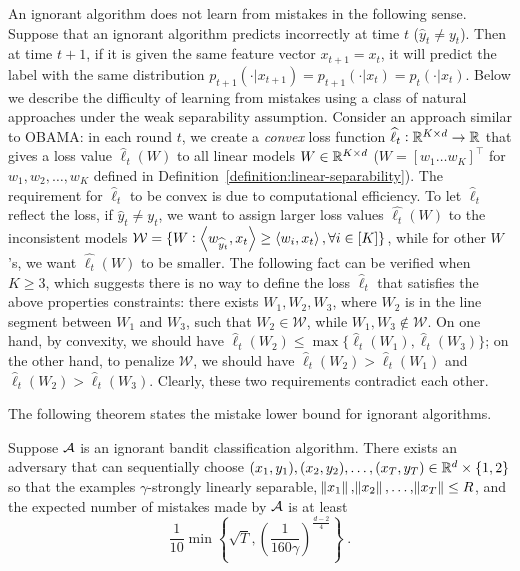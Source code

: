 An ignorant algorithm does not learn from mistakes in the following sense.
Suppose that an ignorant algorithm predicts incorrectly at time $t$ ($\widehat
y_t \neq y_t$). Then at time $t+1$, if it is given the same feature vector
$x_{t+1}=x_t$, it will predict the label with the same distribution
$p_{t+1}(\cdot|x_{t+1})=p_{t+1}(\cdot|x_t)=p_t(\cdot|x_t)$. Below we describe
the difficulty of learning from mistakes using a class of natural approaches
under the weak separability assumption. Consider an approach similar to OBAMA:
in each round $t$, we create a \textit{convex} loss function $\widehat \ell_t:
\mathbb{R}^{K\times d} \to \mathbb{R}$ that gives a loss value $\widehat
\ell_t(W)$ to all linear models $W \in \mathbb{R}^{K\times d}$ ($W=[w_1 \dots
w_K]^\top$ for $w_1, w_2, \dots, w_K$ defined in
Definition~\ref{definition:linear-separability}). The requirement for
$\widehat{\ell}_t$ to be convex is due to computational efficiency. To let
$\widehat{\ell}_t$ reflect the loss, if $\widehat y_t \neq y_t$, we want to
assign larger loss values $\widehat{\ell_t}(W)$ to the inconsistent models
$\mathcal{W}=\{W: \left\langle w_{\widehat y_t}, x_t \right\rangle \ge \left\langle w_i, x_t \right\rangle, \forall
i\in[K]\}$, while for other $W$'s, we want $\widehat{\ell_t}(W)$ to be smaller.
The following fact can be verified when $K\ge 3$, which suggests there is no
way to define the loss $\widehat \ell_t$ that satisfies the above properties
constraints: there exists $W_1, W_2, W_3$, where $W_2$ is in the line segment
between $W_1$ and $W_3$, such that $W_2\in \mathcal{W}$, while $W_1, W_3 \notin
\mathcal{W}$. On one hand, by convexity, we should have
$\widehat{\ell}_t(W_2)\le \max\{\widehat{\ell}_t(W_1),
\widehat{\ell}_t(W_3)\}$; on the other hand, to penalize $\mathcal{W}$, we
should have $\widehat{\ell}_t(W_2) > \widehat{\ell}_t(W_1)$ and
$\widehat{\ell}_t(W_2) > \widehat{\ell}_t(W_3)$. Clearly, these two requirements
contradict each other.

The following theorem states the mistake lower bound for ignorant algorithms.

\begin{theorem}
\label{theorem:ignorant_lower_bound}
Suppose $\mathcal{A}$ is an ignorant bandit classification algorithm. There
exists an adversary that can sequentially choose $(x_1, y_1), (x_2, y_2), \dots,
(x_T, y_T) \in \mathbb{R}^d\times \{1,2\}$ so that the examples $\gamma$-strongly
linearly separable, $\norm{x_1}, \norm{x_2}, \dots, \norm{x_T} \le R$, and the
expected number of mistakes made by $\mathcal{A}$ is at least
$$
\frac{1}{10}\min\left\{\sqrt{T}, \left(\frac{1}{160\gamma}\right)^{\frac{d-2}{4}} \right\} \; .
$$
\end{theorem}

